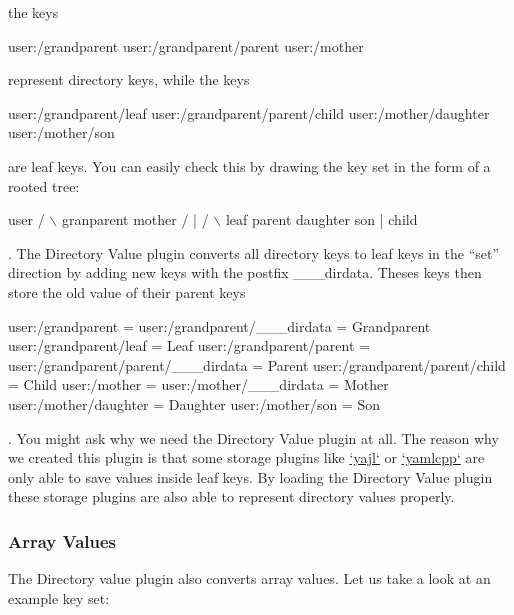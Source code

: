 the keys


\begin{DoxyCode}
user:/grandparent
user:/grandparent/parent
user:/mother
\end{DoxyCode}


represent directory keys, while the keys


\begin{DoxyCode}
user:/grandparent/leaf
user:/grandparent/parent/child
user:/mother/daughter
user:/mother/son
\end{DoxyCode}


are leaf keys. You can easily check this by drawing the key set in the form of a rooted tree\+:


\begin{DoxyCode}
             user
      /               \(\backslash\)
  granparent        mother
  /      |          /    \(\backslash\)
leaf  parent    daughter son
         |
       child
\end{DoxyCode}


. The Directory Value plugin converts all directory keys to leaf keys in the “set” direction by adding new keys with the postfix {\ttfamily \+\_\+\+\_\+\+\_\+dirdata}. Theses keys then store the old value of their parent keys


\begin{DoxyCode}
user:/grandparent                    =
user:/grandparent/\_\_\_dirdata         = Grandparent
user:/grandparent/leaf               = Leaf
user:/grandparent/parent             =
user:/grandparent/parent/\_\_\_dirdata  = Parent
user:/grandparent/parent/child       = Child
user:/mother                         =
user:/mother/\_\_\_dirdata              = Mother
user:/mother/daughter                = Daughter
user:/mother/son                     = Son
\end{DoxyCode}


. You might ask why we need the Directory Value plugin at all. The reason why we created this plugin is that some storage plugins like \hyperlink{autotoc_md777_src_plugins_yajl_README_md}{`yajl`} or \hyperlink{autotoc_md777_src_plugins_yajl_README_md}{`yamlcpp`} are only able to save values inside leaf keys. By loading the Directory Value plugin these storage plugins are also able to represent directory values properly.\hypertarget{autotoc_md170_autotoc_md172}{}\subsubsection{Array Values}\label{autotoc_md170_autotoc_md172}
The Directory value plugin also converts array values. Let us take a look at an example key set\+:


